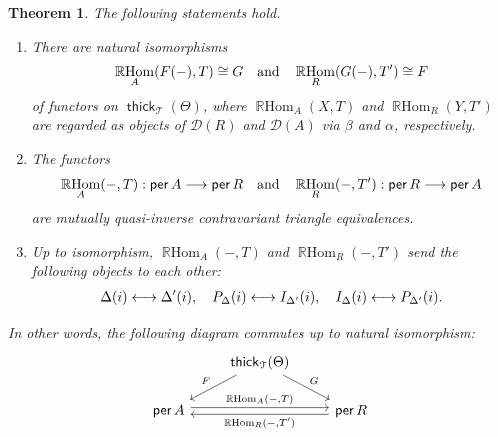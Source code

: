 \documentclass[a4paper,reqno,11pt]{amsart}
\numberwithin{equation}{section}
\newtheorem{theorem}{Theorem}[section]
\theoremstyle{definition}
\newcommand{\D}{\mathcal{D}}
\newcommand{\T}{\mathcal{T}}
\newcommand{\bte}{\Theta}
\newcommand{\bde}{\Delta}
\newcommand{\lto}{\longrightarrow}
\DeclareMathOperator{\thick}{\mathsf{thick}}
\DeclareMathOperator{\per}{\mathsf{per}}
\DeclareMathOperator{\RHom}{\mathbb{R}Hom}
\begin{document}
\begin{theorem}\label{thm:Ringel_duality}
The following statements hold.
\begin{enumerate}
\item There are natural isomorphisms
\begin{align}
\RHom_{A}(F(-),T)\cong G \quad\text{and}\quad \RHom_{R}(G(-),T')\cong F\notag
\end{align}
of functors on $\thick_{\T}(\bte)$, where $\RHom_{A}(X,T)$ and $\RHom_{R}(Y,T')$ are regarded as objects of $\D(R)$ and $\D(A)$ via $\beta$ and $\alpha$, respectively.
\item The functors
\begin{align}
\RHom_{A}(-,T):\per A\lto\per R \quad\text{and}\quad \RHom_{R}(-,T'):\per R\lto\per A\notag
\end{align}
are mutually quasi-inverse contravariant triangle equivalences.
\item Up to isomorphism, $\RHom_{A}(-,T)$ and $\RHom_{R}(-,T')$ send the following objects to each other:
\begin{align}
\bde(i)\longleftrightarrow\bde'(i),\quad P_{\bde}(i)\longleftrightarrow I_{\bde'}(i),\quad I_{\bde}(i)\longleftrightarrow P_{\bde'}(i).\notag
\end{align}
\end{enumerate}
In other words, the following diagram commutes up to natural isomorphism:
\[
\begin{tikzcd}
&\thick_{\T}(\bte)\ar[ld,"F"']\ar[rd,"G"]&\\
\per A \ar[rr, shift left,"{\RHom_{A}(-,T)}"]&& \per R \ar[ll,shift left, "{\RHom_{R}(-,T')}"]
\end{tikzcd}
\]
\end{theorem}
\end{document}
